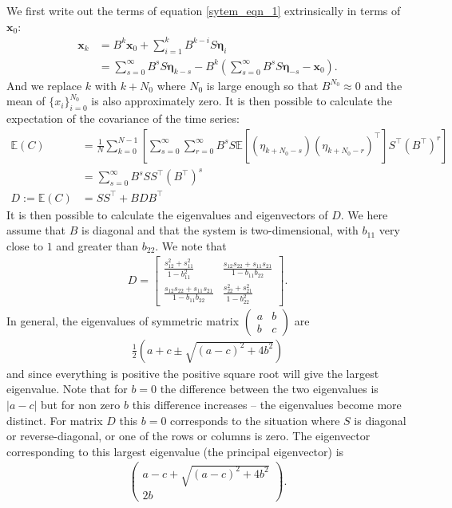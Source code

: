 \documentclass[11pt,a4paper,reqno]{article}
\numberwithin{equation}{section}
\newcommand{\x}{{\mathbf x}}
\newcommand{\etab}{{\mathbf \eta}}
\begin{document}
We first write out the terms of equation \ref{sytem_eqn_1} extrinsically in terms of $\x_0$:
\begin{align}
\x_k &= B^k\x_0 + \sum_{i=1}^{k} B^{k-i}S\etab_i \\
&= \sum_{s=0}^{\infty} B^{s} S \etab_{k-s} - B^k \left(\sum_{s=0}^{\infty} B^{s} S \etab_{-s} - \x_0\right).
\end{align}
And we replace $k$ with $k+N_0$ where $N_0$ is large enough so that $B^{N_0} \approx 0$ and the mean of $\{x_i\}_{i=0}^{N_0}$ is also approximately zero. It is then possible to calculate the expectation of the covariance of the time series:
\begin{align}
\mathbb{E}(C) &= \frac{1}{N}\sum_{k=0}^{N-1}\left[\sum_{s=0}^\infty \sum_{r=0}^\infty B^s S\mathbb{E}\left[(\eta_{k+N_0-s})(\eta_{k+N_0-r})^\top\right] S^\top (B^\top)^r\right]\\
& = \sum_{s=0}^\infty B^s S S^\top (B^\top)^s \\
D :=\mathbb{E}(C) &= SS^\top + B D B^\top
\end{align}
It is then possible to calculate the eigenvalues and eigenvectors of $D$. We here assume that $B$ is diagonal and that the system is two-dimensional, with $b_{11}$ very close to $1$ and greater than $b_{22}$. We note that 
\begin{align}
D = \left[ 
\begin{array}{cc}
\frac{s_{12}^2+s_{11}^2}{1-b_{11}^2} & \frac{s_{12}s_{22}+s_{11}s_{21}}{1-b_{11}b_{22}}\\
\frac{s_{12}s_{22}+s_{11}s_{21}}{1-b_{11}b_{22}} & \frac{s_{22}^2+s_{21}^2}{1-b_{22}^2}
\end{array}
\right].
\label{D_for_B_diag}
\end{align}
In general, the eigenvalues of symmetric matrix 
\(
\left(
\begin{array}{cc}
a&b\\
b&c
\end{array}
\right)
\)
are 
\begin{align}
\frac{1}{2}\left(a+c\pm\sqrt{(a-c)^2+4b^2}\right)
\label{general_eigenvalues}
\end{align}
and since everything is positive the positive square root will give the largest eigenvalue. Note that for $b=0$ the difference between the two eigenvalues is $|a-c|$ but for non zero $b$ this difference increases -- the eigenvalues become more distinct. For matrix $D$ this $b=0$ corresponds to the situation where $S$ is diagonal or reverse-diagonal, or one of the rows or columns is zero. The eigenvector corresponding to this largest eigenvalue (the principal eigenvector) is
\begin{align}
\left(
\begin{array}{c}
a-c + \sqrt{(a-c)^2+4b^2}\\
2b
\end{array}
\right).
\label{largest_eigenvector}
\end{align}
\end{document}
